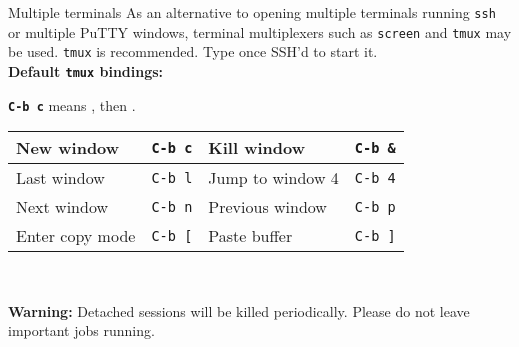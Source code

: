 \begin{block}{Multiple terminals}
  As an alternative to opening multiple terminals running \texttt{ssh} or multiple PuTTY windows, terminal multiplexers such as \texttt{screen} and \texttt{tmux} may be used. \texttt{tmux} is recommended. Type  once SSH'd to start it. \\[0.7em]
  \textbf{Default \texttt{tmux} bindings:} \\
  {\newcommand{\key}[1]{\texttt{C-b #1}}
    \textbf{\key{c}} means , then .
    \begin{tabu} to 0.9\linewidth { X[2] X X[2] X }
      \hline
      New window & \key{c} & Kill window & \key{\&} \\ \hline
      Last window & \key{l} & Jump to window 4 & \key{4} \\ \hline
      Next window & \key{n} & Previous window & \key{p} \\ \hline
      Enter copy mode & \key{[} & Paste buffer & \key{]} \\ \hline
    \end{tabu} \\[1em]
  }
  \textbf{Warning:} Detached sessions will be killed periodically. Please do not leave important jobs running.

\end{block}

